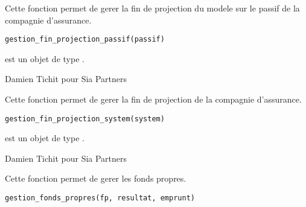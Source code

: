 \documentclass[a4paper]{book}
\begin{document}
%
\begin{Description}\relax
Cette fonction permet de gerer la fin de projection du modele sur le passif de la compagnie d'assurance.
\end{Description}
%
\begin{Usage}
\begin{verbatim}
gestion_fin_projection_passif(passif)
\end{verbatim}
\end{Usage}
%
\begin{Arguments}
\begin{ldescription}
\item[\code{passif}] est un objet de type .
\end{ldescription}
\end{Arguments}
%
\begin{Author}\relax
Damien Tichit pour Sia Partners
\end{Author}
%
\begin{Description}\relax
Cette fonction permet de gerer la fin de projection de la compagnie d'assurance.
\end{Description}
%
\begin{Usage}
\begin{verbatim}
gestion_fin_projection_system(system)
\end{verbatim}
\end{Usage}
%
\begin{Arguments}
\begin{ldescription}
\item[\code{system}] est un objet de type .
\end{ldescription}
\end{Arguments}
%
\begin{Author}\relax
Damien Tichit pour Sia Partners
\end{Author}
%
\begin{Description}\relax
Cette fonction permet de gerer les fonds propres.
\end{Description}
%
\begin{Usage}
\begin{verbatim}
gestion_fonds_propres(fp, resultat, emprunt)
\end{verbatim}
\end{Usage}
\end{document}
